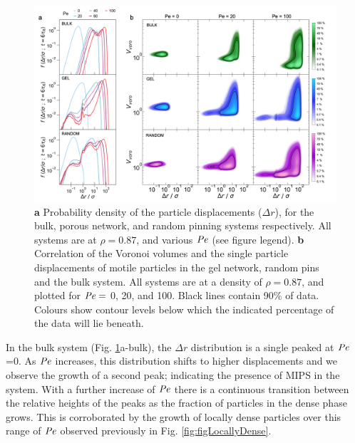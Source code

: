  \begin{figure}
	\centering
	\includegraphics[width=\linewidth]{chapters/activeConfinement/figsActiveConfinement/figCorrelation.png}
	\caption[Distribution of particle displacements and correlation with Voronoi volumes]{\textbf{a} Probability density of the particle displacements ($\Delta r$), for the bulk, porous network, and random pinning systems respectively. All systems are at $\rho=0.87$, and various $\operatorname{\mathit{P\kern-.08em e}}$ (see figure legend). \textbf{b} Correlation of the Voronoi volumes and the single particle displacements of motile particles in the gel network, random pins and the bulk system. All systems are at a density of $\rho = 0.87$, and plotted for $\operatorname{\mathit{P\kern-.08em e}} = $ 0, 20, and 100. Black lines contain 90\% of data. Colours show contour levels below which the indicated percentage of the data will lie beneath.}
	\label{fig:figDR_VORO_corelation}
\end{figure}

In the bulk system (Fig. \ref{fig:figDR_VORO_corelation}a-bulk), the $\Delta r$ distribution is a single peaked at $\operatorname{\mathit{P\kern-.08em e}}$=0. As $\operatorname{\mathit{P\kern-.08em e}}$ increases, this distribution shifts to higher displacements and we observe the growth of a second peak; indicating the presence of MIPS in the system. With a further increase of $\operatorname{\mathit{P\kern-.08em e}}$ there is a continuous transition between the relative heights of the peaks as the fraction of particles in the dense phase grows. This is corroborated by the growth of locally dense particles over this range of $\operatorname{\mathit{P\kern-.08em e}}$ observed previously in Fig. \ref{fig:figLocallyDense}. 



